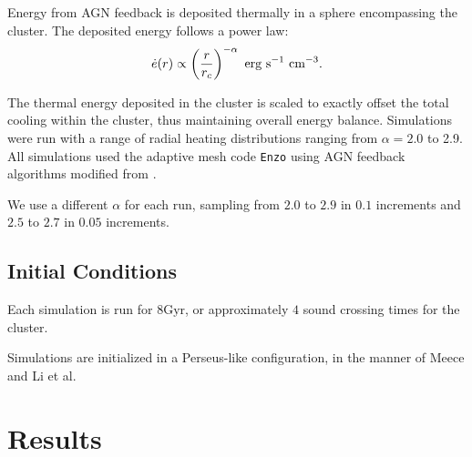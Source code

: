 \documentclass[iop,apjl, twocolappendix]{emulateapj}   %
\begin{document}
Energy from AGN feedback is deposited thermally in a sphere encompassing the
cluster. The deposited energy follows a power law:
\vspace{-0.5em}
\begin{equation}
	\dot{e}(r) \propto \left( \frac{r}{r_c} \right )^{-\alpha} \text{ erg} \text{ s}^{-1} \text{ cm}^{-3}.
	\vspace{-0.5em}
\end{equation}

\noindent
The thermal energy deposited in the cluster is scaled to exactly offset the
total cooling within the cluster, thus maintaining overall energy balance.
Simulations were run with a range of radial heating distributions ranging from
$\alpha = 2.0$ to 2.9. 
All simulations used the adaptive mesh code \texttt{Enzo}
\cite{bryan_enzo_2014-1} using AGN feedback algorithms modified from
\cite{meece_jr_agn_2016,meece_triggering_2017}.


We use a different $\alpha$ for each run, sampling from $2.0$ to
$2.9$ in $0.1$ increments and $2.5$ to $2.7$ in $0.05$ increments.

\subsection{Initial Conditions}
\label{sec:initial_conditions}
\textbullet Each simulation is run for $8 \text{Gyr}$, or approximately $4$
sound crossing times for the cluster. 

Simulations are initialized in a Perseus-like configuration, in the manner
of Meece \cite{meece_triggering_2017} and Li et al.\ \cite{li_cooling_2015} 

\section{Results}
\label{sec:results}
\end{document}
